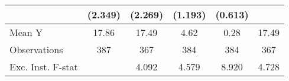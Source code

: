 {\begin{tabular}{l*{5}{c}}
            &     (2.349)         &     (2.269)         &     (1.193)         &     (0.613)         &                     \\
\midrule
Mean Y      &       17.86         &       17.49         &        4.62         &        0.28         &       17.49         \\
Observations&         387         &         367         &         384         &         384         &         367         \\
Exc. Inst. F-stat&                     &       4.092         &       4.579         &       8.920         &       4.728         \\
\bottomrule
\end{tabular}
}

